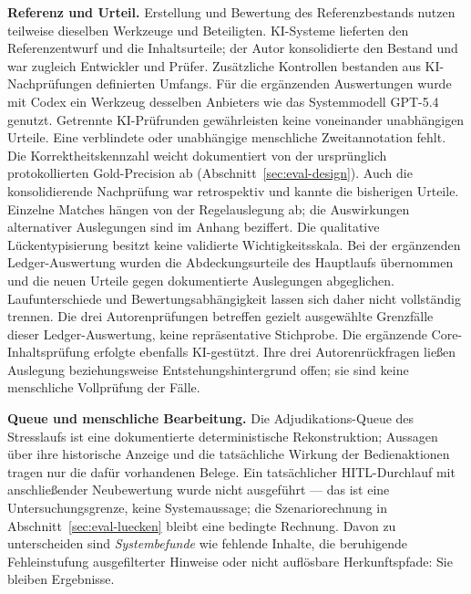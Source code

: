 \textbf{Referenz und Urteil.} Erstellung und Bewertung des
Referenzbestands nutzen teilweise dieselben Werkzeuge und Beteiligten.
KI-Systeme lieferten den Referenzentwurf und die Inhaltsurteile;
der Autor konsolidierte den Bestand und war zugleich Entwickler und
Prüfer. Zusätzliche Kontrollen bestanden aus KI-Nachprüfungen
definierten Umfangs. Für die ergänzenden Auswertungen wurde mit Codex
ein Werkzeug desselben Anbieters wie das Systemmodell GPT-5.4 genutzt.
Getrennte KI-Prüfrunden gewährleisten keine voneinander unabhängigen
Urteile. Eine verblindete oder unabhängige menschliche
Zweitannotation fehlt. Die Korrektheitskennzahl weicht dokumentiert
von der ursprünglich protokollierten Gold-Precision ab
(Abschnitt~\ref{sec:eval-design}). Auch die konsolidierende Nachprüfung
war retrospektiv und kannte die bisherigen Urteile. Einzelne Matches
hängen von der Regelauslegung ab; die Auswirkungen alternativer
Auslegungen sind im Anhang beziffert. Die qualitative Lückentypisierung
besitzt keine validierte Wichtigkeitsskala. Bei der ergänzenden
Ledger-Auswertung wurden die Abdeckungsurteile des Hauptlaufs
übernommen und die neuen Urteile gegen dokumentierte Auslegungen
abgeglichen. Laufunterschiede und Bewertungsabhängigkeit lassen sich
daher nicht vollständig trennen. Die drei Autorenprüfungen betreffen
gezielt ausgewählte Grenzfälle dieser Ledger-Auswertung, keine
repräsentative Stichprobe. Die ergänzende Core-Inhaltsprüfung erfolgte
ebenfalls KI-gestützt. Ihre drei Autorenrückfragen ließen Auslegung
beziehungsweise Entstehungshintergrund offen; sie sind keine
menschliche Vollprüfung der Fälle.

\textbf{Queue und menschliche Bearbeitung.} Die
Adjudikations-Queue des Stresslaufs ist eine dokumentierte
deterministische Rekonstruktion; Aussagen über ihre historische
Anzeige und die tatsächliche Wirkung der Bedienaktionen tragen
nur die dafür vorhandenen Belege. Ein tatsächlicher
HITL-Durchlauf mit anschließender Neubewertung wurde nicht
ausgeführt --- das ist eine Untersuchungsgrenze, keine
Systemaussage; die Szenariorechnung in Abschnitt~\ref{sec:eval-luecken} bleibt eine bedingte
Rechnung. Davon zu unterscheiden sind \emph{Systembefunde} wie
fehlende Inhalte, die beruhigende Fehleinstufung ausgefilterter
Hinweise oder nicht auflösbare Herkunftspfade: Sie bleiben
Ergebnisse.

